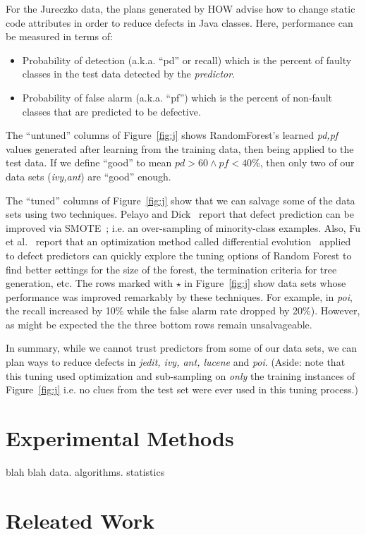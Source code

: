 \documentclass[conference]{IEEEtran}
\newcommand{\bi}{\begin{itemize}}
\newcommand{\ei}{\end{itemize}}
\newcommand{\fig}[1]{Figure~\ref{fig:#1}}
\begin{document}
For the  Jureczko   data,
the plans generated by HOW advise   how to change static code attributes in order to reduce defects in
Java classes.  Here,
performance can be measured in terms of:
\bi
\item Probability of detection (a.k.a. ``pd'' or recall) which is the percent of faulty classes in
the test data detected
by the {\em predictor}.
\item Probability of false alarm (a.k.a. ``pf'') which is the percent of non-fault
classes that are predicted to be defective.
\ei 
The ``untuned'' columns of \fig{j} shows RandomForest's learned {\em pd,pf}
values generated after learning from the training data, then being applied to the test data.
If we define ``good'' to mean $\mathit{pd}>60 \wedge \mathit{pf} < 40$\%,
then only two of our data sets ({\em ivy,ant}) are ``good'' enough. 

The ``tuned'' columns of \fig{j} show that we can salvage some of the data sets
using two techniques.
 Pelayo and Dick~\cite{pelayo07} report that defect prediction can be improved via SMOTE~\cite{Chawla2002}; i.e. an over-sampling of minority-class examples.
 Also, Fu et al.~\cite{fu:ase15} report that an optimization method called differential evolution~\cite{storn97}
applied to defect predictors can quickly explore the tuning
options of Random Forest to find better settings for the size of the forest, the termination criteria
for tree generation, etc.
The rows marked with $\star$ in \fig{j} show data sets whose performance was improved remarkably by these
techniques. For example, in {\em poi}, the recall increased by 10\% while the false alarm rate dropped by 20\%).
However,  as might be expected
the the three bottom rows remain
unsalvageable.

In summary, while we cannot trust predictors from some of our data sets,
we can plan ways to reduce defects in {\em jedit, ivy, ant, lucene} and {\em poi}.
(Aside: note that this tuning used optimization and sub-sampling   on   {\em only} the
training instances of \fig{j}
i.e.
no clues from the test set were ever used in this tuning process.)


 
 

\section{Experimental Methods}

blah blah data. algorithms. statistics

\section{Releated Work}
\end{document}
